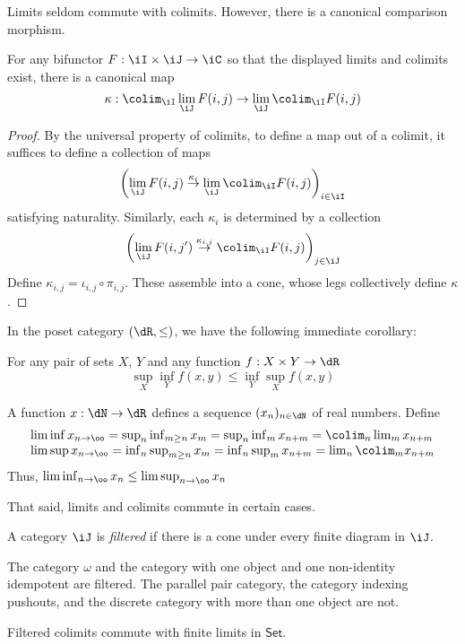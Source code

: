 \documentclass{amsart}
\begin{document}
Limits seldom commute with colimits.
However, there is a canonical comparison morphism.

\begin{thm}
  For any bifunctor $F : \iI \times \iJ \to \iC$ so that the displayed limits and colimits exist, there is a canonical map
  \[
    \kappa : \colim_{\iI}\lim_{\iJ}F(i,j) \to \lim_{\iJ}\colim_{\iI}F(i,j)
  \]
\end{thm}
\begin{proof}
  By the universal property of colimits, to define a map out of a colimit, it suffices to define a collection of maps
  \[
    \left( \lim_{\iJ}F(i,j) \overset{\kappa_{i}}{\to} \lim_{\iJ}\colim_{\iI}F(i,j) \right)_{i \in \iI}
  \]
  satisfying naturality.
  Similarly, each $\kappa_{i}$ is determined by a collection
  \[
    \left( \lim_{\iJ}F(i,j') \overset{\kappa_{i,j}}{\to} \colim_{\iI}F(i,j) \right)_{j \in \iJ}
  \]
  Define $\kappa_{i,j} = \iota_{i,j} \circ \pi_{i,j}$.
  These assemble into a cone, whose legs collectively define $\kappa$.
\end{proof}

\begin{eg}
  In the poset category $(\dR, \leq)$, we have the following immediate corollary:
  \begin{cor}
    For any pair of sets $X$, $Y$ and any function $f : X \times Y \to \dR$
    \[
      \sup_{X}\inf_{Y}f(x,y) \leq \inf_{Y}\sup_{X}f(x,y)
    \]
  \end{cor}
\end{eg}

\begin{eg}
  A function $x : \dN \to \dR$ defines a sequence $(x_{n})_{n \in \dN}$ of real numbers.
  Define
  \[
    \begin{array}{l}
      \liminf x_{n \to \oo} = \sup_{n}\inf_{m \geq n}x_{m} = \sup_{n}\inf_{m}x_{n+m} = \colim_{n}\lim_{m}x_{n+m}\\
      \limsup x_{n \to \oo} = \inf_{n}\sup_{m \geq n}x_{m} = \inf_{n}\sup_{m}x_{n+m} = \lim_{n}\colim_{m}x_{n+m}\\
    \end{array}
  \]
  Thus, $\liminf_{n \to \oo} x_{n} \leq \limsup_{n \to \oo} x_{n}$
\end{eg}

That said, limits and colimits commute in certain cases.

\begin{defn}
  A category $\iJ$ is \emph{filtered} if there is a cone under every finite diagram in $\iJ$.
\end{defn}

\begin{eg}
  The category $\omega$ and the category with one object and one non-identity idempotent are filtered.
  The parallel pair category, the category indexing pushouts, and the discrete category with more than one object are not.
\end{eg}

\begin{thm}
  Filtered colimits commute with finite limits in $\mathsf{Set}$.
\end{thm}



\end{document}
